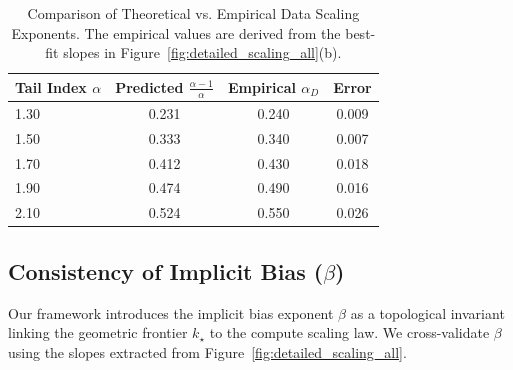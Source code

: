 \documentclass{article}
\theoremstyle{plain}
\theoremstyle{definition}
\theoremstyle{remark}
\begin{document}
\begin{table}[h]
\caption{Comparison of Theoretical vs. Empirical Data Scaling Exponents. The empirical values are derived from the best-fit slopes in Figure~\ref{fig:detailed_scaling_all}(b).}
\label{tab:exponent_comparison}
\begin{center}
\begin{small}
\begin{sc}
\begin{tabular}{lccc}
\toprule
Tail Index $\alpha$ & Predicted $\frac{\alpha-1}{\alpha}$ & Empirical $\alpha_D$ & Error \\
\midrule
1.30 & 0.231 & 0.240 & 0.009 \\
1.50 & 0.333 & 0.340 & 0.007 \\
1.70 & 0.412 & 0.430 & 0.018 \\
1.90 & 0.474 & 0.490 & 0.016 \\
2.10 & 0.524 & 0.550 & 0.026 \\
\bottomrule
\end{tabular}
\end{sc}
\end{small}
\end{center}
\end{table}

\subsection{Consistency of Implicit Bias ($\beta$)}
Our framework introduces the implicit bias exponent $\beta$ as a topological invariant linking the geometric frontier $k_\star$ to the compute scaling law. We cross-validate $\beta$ using the slopes extracted from Figure~\ref{fig:detailed_scaling_all}.
\end{document}

